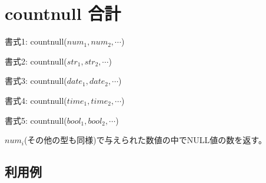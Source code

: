 
%

\section{countnull 合計\label{sect:countnull}}

書式1: countnull($num_1,num_2,\cdots$)

書式2: countnull($str_1,str_2,\cdots$)

書式3: countnull($date_1,date_2,\cdots$)

書式4: countnull($time_1,time_2,\cdots$)

書式5: countnull($bool_1,bool_2,\cdots$)

$num_i$(その他の型も同様)で与えられた数値の中でNULL値の数を返す。

\subsection*{利用例}


%

